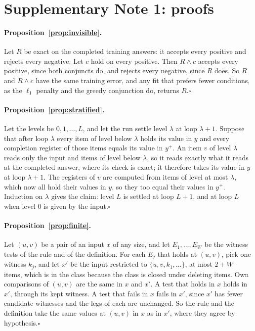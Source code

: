 \section*{Supplementary Note 1: proofs}

\paragraph{Proposition~\ref{prop:invisible}.} Let $R$ be exact on the completed training answers: it accepts every
positive and rejects every negative. Let $c$ hold on every positive. Then $R\wedge c$ accepts every positive, since both
conjuncts do, and rejects every negative, since $R$ does. So $R$ and $R \wedge c$ have the same training error, and
any fit that prefers fewer conditions, as the $\ell_1$ penalty and the greedy conjunction do, returns $R$.\hfill$\square$

\paragraph{Proposition~\ref{prop:stratified}.} Let the levels be $0, 1, \ldots, L$, and let the run settle level $\lambda$
at loop $\lambda + 1$. Suppose that after loop $\lambda$ every item of level below $\lambda$ holds its value in $y$ and
every completion register of those items equals its value in $y^{+}$. An item $v$ of level $\lambda$ reads only the input
and items of level below $\lambda$, so it reads exactly what it reads at the completed answer, where its check is exact;
it therefore takes its value in $y$ at loop $\lambda+1$. The registers of $v$ are computed from items of level at most
$\lambda$, which now all hold their values in $y$, so they too equal their values in $y^{+}$. Induction on $\lambda$
gives the claim: level $L$ is settled at loop $L+1$, and at loop $L$ when level $0$ is given by the input.\hfill$\square$

\paragraph{Proposition~\ref{prop:finite}.} Let $(u,v)$ be a pair of an input $x$ of any size, and let $E_1,\ldots,E_W$ be
the witness tests of the rule and of the definition. For each $E_j$ that holds at $(u,v)$, pick one witness $k_j$, and let
$x'$ be the input restricted to $\{u,v,k_1,\ldots\}$, at most $2+W$ items, which is in the class because the class is
closed under deleting items. Own comparisons of $(u,v)$ are the same in $x$ and $x'$. A test that holds in $x$ holds in
$x'$, through its kept witness. A test that fails in $x$ fails in $x'$, since $x'$ has fewer candidate witnesses and the
legs of each are unchanged. So the rule and the definition take the same values at $(u,v)$ in $x$ as in $x'$, where they
agree by hypothesis.\hfill$\square$

